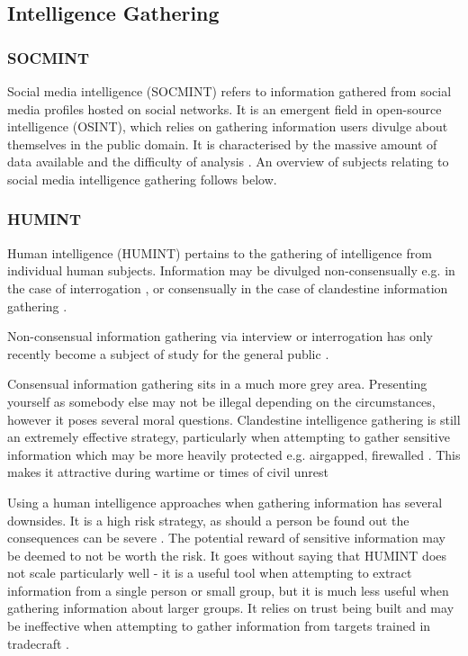 \documentclass[12pt]{article}
\begin{document}
\subsection{Intelligence Gathering}
\subsubsection{SOCMINT}
Social media intelligence (SOCMINT) refers to information gathered from social media profiles hosted on social networks. It is an emergent field in open-source intelligence (OSINT), which relies on gathering information users divulge about themselves in the public domain. It is characterised by the massive amount of data available \citep{socmintoverview} and the difficulty of analysis \citep{socmintlitreview}. An overview of subjects relating to social media intelligence gathering follows below.

\subsubsection{HUMINT}
Human intelligence (HUMINT) pertains to the gathering of intelligence from individual human subjects. Information may be divulged non-consensually e.g. in the case of interrogation \citep{criminalvshumint}, or consensually in the case of clandestine information gathering \citep{clandestinehumint}. 

Non-consensual information gathering via interview or interrogation has only recently become a subject of study for the general public \citep{humintinterrogators}. 

Consensual information gathering sits in a much more grey area. Presenting yourself as somebody else may not be illegal depending on the circumstances, however it poses several moral questions. Clandestine intelligence gathering is still an extremely effective strategy, particularly when attempting to gather sensitive information which may be more heavily protected e.g. airgapped, firewalled \citep{clandestinehumint}. This makes it attractive during wartime or times of civil unrest \citep{humintni}\citep{humintcyberage}

Using a human intelligence approaches when gathering information has several downsides. It is a high risk strategy, as should a person be found out the consequences can be severe \citep{humintni}. The potential reward of sensitive information may be deemed to not be worth the risk. It goes without saying that HUMINT does not scale particularly well - it is a useful tool when attempting to extract information from a single person or small group, but it is much less useful when gathering information about larger groups. It relies on trust being built and may be ineffective when attempting to gather information from targets trained in tradecraft \citep{humintni}\citep{clandestinehumint}\citep{humintcyberage}.
\end{document}
